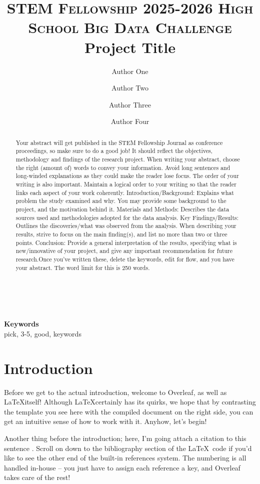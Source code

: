 \documentclass[10pt,twocolumn,letterpaper]{article}
\title{
		\usefont{OT1}{bch}{b}{n}
		\normalfont \normalsize \textsc{STEM Fellowship 2025-2026 High School Big Data Challenge} \\ [10pt]
		\huge Project Title \\
}
\author[1]{Author One}
\author[1]{Author Two}
\author[1]{Author Three}
\author[2]{Author Four}
\affil[1]{School 1, City, Province}
\affil[2]{School 2}
\begin{document}
\maketitle

\begin{abstract}
Your abstract will get published in the STEM Fellowship Journal as conference proceedings, so make sure to do a good job! It should reflect the objectives, methodology and findings of the research project. When writing your abstract, choose the right (amount of) words to convey your information. Avoid long sentences and long-winded explanations as they could make the reader lose focus. The order of your writing is also important. Maintain a logical order to your writing so that the reader links each aspect of your work coherently. Introduction/Background: Explains what problem the study examined and why. You may provide some background to the project, and the motivation behind it. Materials and Methods: Describes the data sources used and methodologies adopted for the data analysis. Key Findings/Results: Outlines the discoveries/what was observed from the analysis. When describing your results, strive to focus on the main finding(s), and list no more than two or three points. Conclusion: Provide a general interpretation of the results, specifying what is new/innovative of your project, and give any important recommendation for future research.Once you've written these, delete the keywords, edit for flow, and you have your abstract. The word limit for this is 250 words.
\end{abstract} \\ 
\\ 
{\textbf{Keywords} \\
pick, 3-5, good, keywords
}

\section{Introduction}
Before we get to the actual introduction, welcome to Overleaf, as well as \LaTeX itself! Although \LaTeX certainly has its quirks, we hope that by contrasting the template you see here with the compiled document on the right side, you can get an intuitive sense of how to work with it. Anyhow, let's begin!

Another thing before the introduction; here, I'm going attach a citation to this sentence \cite{ReferenceName}. Scroll on down to the bibliography section of the \LaTeX\ code if you'd like to see the other end of the built-in references system. The numbering is all handled in-house -- you just have to assign each reference a key, and Overleaf takes care of the rest!
\end{document}
